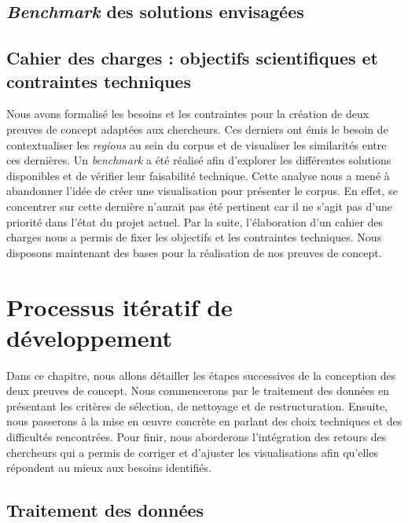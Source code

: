 \documentclass[a4paper,12pt,twoside]{book}
\newcommand{\clearemptydoublepage}{\newpage{\pagestyle{empty}\cleardoublepage}}
\begin{document}
	\section{\textit{Benchmark} des solutions envisagées}
	
	
	\section[Le cahier des charges]{Cahier des charges : objectifs scientifiques et contraintes techniques}
	
	
	Nous avons formalisé les besoins et les contraintes pour la création de deux preuves de concept adaptées aux chercheurs. Ces derniers ont émis le besoin de contextualiser les \textit{regions} au sein du corpus et de visualiser les similarités entre ces dernières. Un \textit{benchmark} a été réalisé afin d'explorer les différentes solutions disponibles et de vérifier leur faisabilité technique. Cette analyse nous a mené à abandonner l'idée de créer une visualisation pour présenter le corpus. En effet, se concentrer sur cette dernière n'aurait pas été pertinent car il ne s'agit pas d'une priorité dans l'état du projet actuel. Par la suite, l'élaboration d'un cahier des charges nous a permis de fixer les objectifs et les contraintes techniques. Nous disposons maintenant des bases pour la réalisation de nos preuves de concept.
	
	\clearemptydoublepage
	
	\chapter{Processus itératif de développement}
	
	Dans ce chapitre, nous allons détailler les étapes successives de la conception des deux preuves de concept. Nous commencerons par le traitement des données en présentant les critères de sélection, de nettoyage et de restructuration. Ensuite, nous passerons à la mise en œuvre concrète en parlant des choix techniques et des difficultés rencontrées. Pour finir, nous aborderons l'intégration des retours des chercheurs qui a permis de corriger et d'ajuster les visualisations afin qu'elles répondent au mieux aux besoins identifiés.
	
	\section{Traitement des données}
	
	
\end{document}

